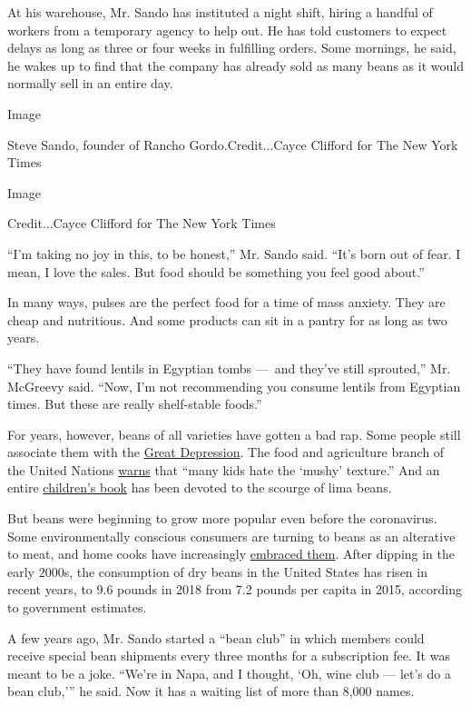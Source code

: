At his warehouse, Mr. Sando has instituted a night shift, hiring a
handful of workers from a temporary agency to help out. He has told
customers to expect delays as long as three or four weeks in fulfilling
orders. Some mornings, he said, he wakes up to find that the company has
already sold as many beans as it would normally sell in an entire day.

Image

Steve Sando, founder of Rancho Gordo.Credit...Cayce Clifford for The New
York Times

Image

Credit...Cayce Clifford for The New York Times

``I'm taking no joy in this, to be honest,'' Mr. Sando said. ``It's born
out of fear. I mean, I love the sales. But food should be something you
feel good about.''

In many ways, pulses are the perfect food for a time of mass anxiety.
They are cheap and nutritious. And some products can sit in a pantry for
as long as two years.

``They have found lentils in Egyptian tombs ---~and they've still
sprouted,'' Mr. McGreevy said. ``Now, I'm not recommending you consume
lentils from Egyptian times. But these are really shelf-stable foods.''

For years, however, beans of all varieties have gotten a bad rap. Some
people still associate them with the
\href{https://www.theatlantic.com/business/archive/2016/12/great-depression-eat/511355/}{Great
Depression}. The food and agriculture branch of the United Nations
\href{http://www.fao.org/fao-stories/article/en/c/1126738/}{warns} that
``many kids hate the `mushy' texture.'' And an entire
\href{https://www.kirkusreviews.com/book-reviews/dan-yaccarino/the-lima-bean-monster/}{children's
book} has been devoted to the scourge of lima beans.

But beans were beginning to grow more popular even before the
coronavirus. Some environmentally conscious consumers are turning to
beans as an alterative to meat, and home cooks have increasingly
\href{https://www.eater.com/2019/12/12/20974754/dried-beans-trend-rancho-gordo-instant-pot}{embraced
them}. After dipping in the early 2000s, the consumption of dry beans in
the United States has risen in recent years, to 9.6 pounds in 2018 from
7.2 pounds per capita in 2015, according to government estimates.

A few years ago, Mr. Sando started a ``bean club'' in which members
could receive special bean shipments every three months for a
subscription fee. It was meant to be a joke. ``We're in Napa, and I
thought, `Oh, wine club --- let's do a bean club,''' he said. Now it has
a waiting list of more than 8,000 names.

